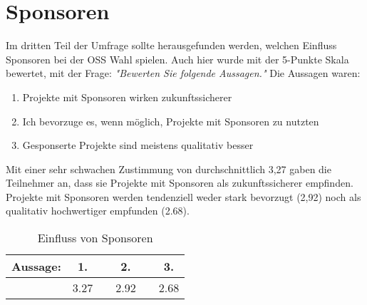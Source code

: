 \section{Sponsoren}\label{sec:umfrage_sponsoren}


Im dritten Teil der Umfrage sollte herausgefunden werden, welchen Einfluss Sponsoren bei der OSS Wahl
spielen. Auch hier wurde mit der 5-Punkte Skala bewertet, mit der Frage: \textit{"Bewerten Sie folgende
    Aussagen."} Die Aussagen waren:

\begin{enumerate}
    \setlength\itemsep{0em}
    \item Projekte mit Sponsoren wirken zukunftssicherer
    \item Ich bevorzuge es, wenn möglich, Projekte mit Sponsoren zu nutzten
    \item Gesponserte Projekte sind meistens qualitativ besser
\end{enumerate}

\noindent
Mit einer sehr schwachen Zustimmung von durchschnittlich 3,27 gaben die Teilnehmer an, dass sie 
Projekte mit Sponsoren als zukunftssicherer empfinden. Projekte mit Sponsoren werden tendenziell
weder stark bevorzugt (2,92) noch als qualitativ hochwertiger empfunden (2.68).

\begin{table}[h]
    \begin{tabular}{cccccc}
        \hline
        Aussage: \hspace{1cm} & 1.   & \hspace{0.75cm} & 2.   & \hspace{0.75cm} & 3.   \\ \hline
                              & 3.27 &                 & 2.92 &                 & 2.68
    \end{tabular}%
    \caption{\label{tab:sponsorens}Einfluss von Sponsoren}
\end{table}



